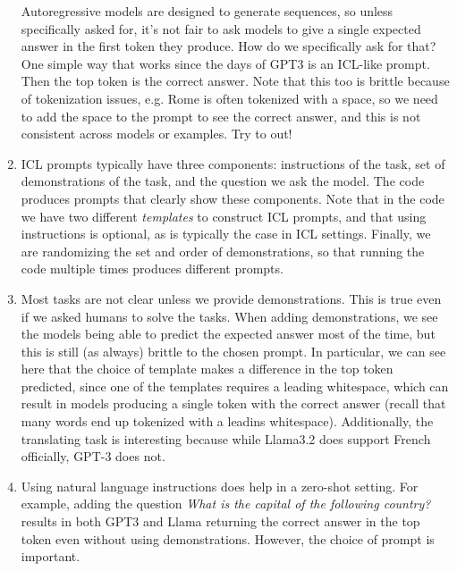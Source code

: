 \documentclass[11pt,a4paper]{article}
\begin{document}
\begin{enumerate}[label=(\alph*)]
          Autoregressive models are designed to generate sequences, so unless
          specifically asked for, it's not fair to ask models to give a single
          expected answer in the first token they produce.
          How do we specifically ask for that?
          One simple way that works since the days of GPT3 is an ICL-like
          prompt.
          Then the top token is the correct answer.
          Note that this too is brittle because of tokenization issues, e.g.
          Rome is often tokenized with a space, so we need to add the space to
          the prompt to see the correct answer, and this is not consistent
          across models or examples.
          Try to out!
    \item ICL prompts typically have three components: instructions of the task,
          set of demonstrations of the task, and the question we ask the model.
          The code produces prompts that clearly show these components.
          Note that in the code we have two different \emph{templates} to
          construct ICL prompts, and that using instructions is optional, as is
          typically the case in ICL settings.
          Finally, we are randomizing the set and order of demonstrations, so
          that running the code multiple times produces different prompts.
    \item Most tasks are not clear unless we provide demonstrations. This is
          true even if we asked humans to solve the tasks.
          When adding demonstrations, we see the models being able to predict
          the expected answer most of the time, but this is still (as always)
          brittle to the chosen prompt.
          In particular, we can see here that the choice of template makes a
          difference in the top token predicted, since one of the templates
          requires a leading whitespace, which can result in models producing
          a single token with the correct answer (recall that many words end
          up tokenized with a leadins whitespace).
          Additionally, the translating task is interesting because while
          Llama3.2 does support French officially, GPT-3 does not.
    \item Using natural language instructions does help in a zero-shot setting.
          For example, adding the question \emph{What is the capital of the
              following country?} results in both GPT3 and Llama returning the
          correct answer in the top token even without using demonstrations.
          However, the choice of prompt is important.

\end{enumerate}
\end{document}
